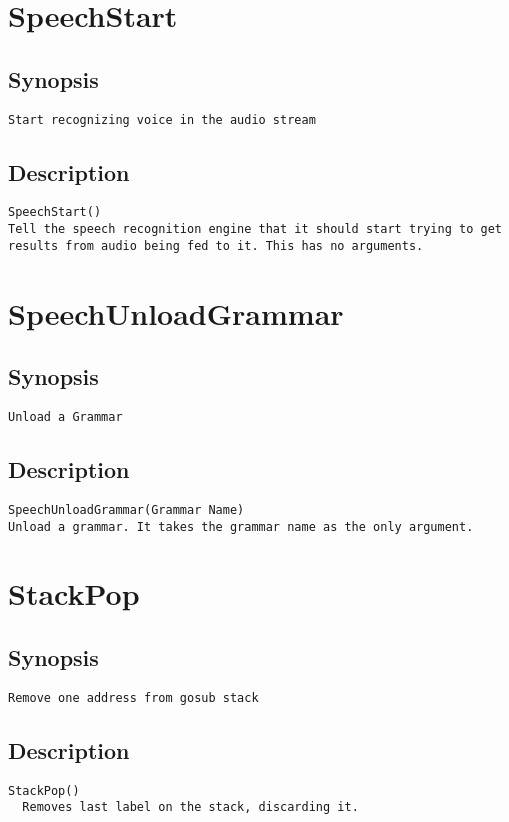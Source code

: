 \section{SpeechStart}
\subsection{Synopsis}
\begin{verbatim}
Start recognizing voice in the audio stream
\end{verbatim}
\subsection{Description}
\begin{verbatim}
SpeechStart()
Tell the speech recognition engine that it should start trying to get results from audio being fed to it. This has no arguments.

\end{verbatim}


\section{SpeechUnloadGrammar}
\subsection{Synopsis}
\begin{verbatim}
Unload a Grammar
\end{verbatim}
\subsection{Description}
\begin{verbatim}
SpeechUnloadGrammar(Grammar Name)
Unload a grammar. It takes the grammar name as the only argument.

\end{verbatim}


\section{StackPop}
\subsection{Synopsis}
\begin{verbatim}
Remove one address from gosub stack
\end{verbatim}
\subsection{Description}
\begin{verbatim}
StackPop()
  Removes last label on the stack, discarding it.

\end{verbatim}


